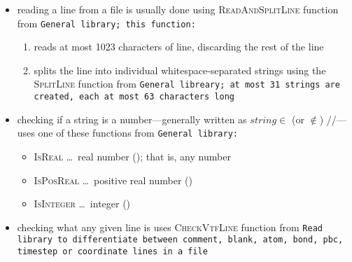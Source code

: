 \begin{itemize}
  \item reading a line from a file is usually done using
    \textsc{ReadAndSplitLine} function from \tt{General} library; this function:
    \begin{enumerate}
      \item reads at most 1023 characters of line, discarding the rest of the
        line
      \item splits the line into individual whitespace-separated strings using
        the \textsc{SplitLine} function from \tt{General} libreary; at most 31
        strings are created, each at most 63 characters long
    \end{enumerate}
  \item checking if a string is a number---generally written as $string
    \in$ (or $\notin$) \Real/\RealP/\Int---uses one of these functions from
    \tt{General} library:
    \begin{itemize}
      \item \textsc{IsReal} \ldots \ real number (\Real); that is, any number
      \item \textsc{IsPosReal} \ldots \ positive real number (\RealP)
      \item \textsc{IsInteger} \ldots \ integer (\Int)
    \end{itemize}
  \item checking what any given line is uses \textsc{CheckVtfLine} function from
    \tt{Read} library to differentiate between comment, blank, \tt{atom},
    \tt{bond}, \tt{pbc}, \tt{timestep} or coordinate lines in a \vtf file
\end{itemize}




